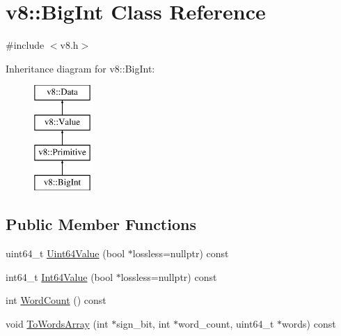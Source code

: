 \hypertarget{classv8_1_1BigInt}{}\section{v8\+:\+:Big\+Int Class Reference}
\label{classv8_1_1BigInt}


{\ttfamily \#include $<$v8.\+h$>$}

Inheritance diagram for v8\+:\+:Big\+Int\+:\begin{figure}[H]
\begin{center}
\leavevmode
\includegraphics[height=4.000000cm]{classv8_1_1BigInt}
\end{center}
\end{figure}
\subsection*{Public Member Functions}
\begin{DoxyCompactItemize}
\item 
uint64\+\_\+t \mbox{\hyperlink{classv8_1_1BigInt_a32d8d340aef40da93cde35a9baf7e58d}{Uint64\+Value}} (bool $\ast$lossless=nullptr) const
\item 
int64\+\_\+t \mbox{\hyperlink{classv8_1_1BigInt_a6478543bf9a595571d76e60fd3f2af0e}{Int64\+Value}} (bool $\ast$lossless=nullptr) const
\item 
int \mbox{\hyperlink{classv8_1_1BigInt_a840783db8ae94178040c5a8a7bb52875}{Word\+Count}} () const
\item 
void \mbox{\hyperlink{classv8_1_1BigInt_adbc582fd6ae26b6afe9b5591b5fe06e7}{To\+Words\+Array}} (int $\ast$sign\+\_\+bit, int $\ast$word\+\_\+count, uint64\+\_\+t $\ast$words) const
\end{DoxyCompactItemize}
